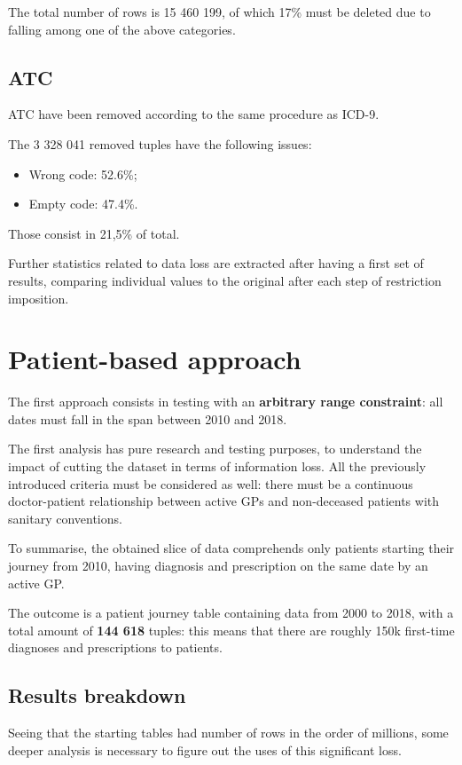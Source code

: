 The total number of rows is 15 460 199, of which 17\% must be deleted due to falling among one of the above categories.

\subsection{ATC}
ATC have been removed according to the same procedure as ICD-9.

The 3 328 041 removed tuples have the following issues:
\begin{itemize}
	\item Wrong code: 52.6\%;
	\item Empty code: 47.4\%.
\end{itemize}

Those consist in 21,5\% of total.

Further statistics related to data loss are extracted after having a first set of results, comparing individual values to the original after each step of restriction imposition. 

\section{Patient-based approach}
The first approach consists in testing with an \textbf{arbitrary range constraint}: all dates must fall in the span between 2010 and 2018.

The first analysis has pure research and testing purposes, to understand the impact of cutting the dataset in terms of information loss. All the previously introduced criteria must be considered as well: there must be a continuous doctor-patient relationship between active GPs and non-deceased patients with sanitary conventions.

To summarise, the obtained slice of data comprehends only patients starting their journey from 2010, having diagnosis and prescription on the same date by an active GP.

The outcome is a patient journey table containing data from 2000 to 2018, with a total amount of \textbf{144 618} tuples: this means that there are roughly 150k first-time diagnoses and prescriptions to patients. 

\subsection{Results breakdown}
Seeing that the starting tables had number of rows in the order of millions, some deeper analysis is necessary to figure out the uses of this significant loss.

